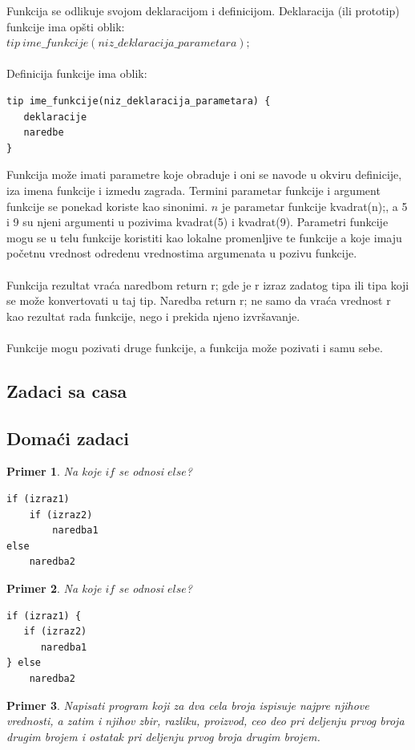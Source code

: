 \documentclass[a4paper]{article}
\newtheorem{primer}{Primer}[section]
\begin{document}
Funkcija se odlikuje svojom deklaracijom i definicijom.
Deklaracija (ili prototip) funkcije ima opšti oblik:\\
$tip\ ime\_funkcije(niz\_deklaracija\_parametara);$\\\\
Definicija funkcije ima oblik:
\begin{verbatim}
tip ime_funkcije(niz_deklaracija_parametara) {
   deklaracije
   naredbe
}
\end{verbatim}

Funkcija može imati parametre koje obraduje i oni se navode u
okviru definicije, iza imena funkcije i izmedu zagrada.
Termini parametar funkcije i argument funkcije se ponekad
koriste kao sinonimi.
$n$ je parametar funkcije kvadrat(n);, a 5 i 9 su
njeni argumenti u pozivima kvadrat(5) i kvadrat(9).
Parametri funkcije mogu se u telu funkcije koristiti kao lokalne
promenljive te funkcije a koje imaju početnu vrednost
odredenu vrednostima argumenata u pozivu funkcije.\\\\
Funkcija rezultat vraća naredbom return r; gde je r izraz
zadatog tipa ili tipa koji se može konvertovati u taj tip.
Naredba return r; ne samo da vraća vrednost r kao rezultat
rada funkcije, nego i prekida njeno izvršavanje.\\\\
Funkcije mogu pozivati druge funkcije, a funkcija može pozivati i samu sebe.

\subsection{Zadaci sa casa}

\subsection{Domaći zadaci}
\begin{primer}
Na koje $if$ se odnosi $else$?
\begin{verbatim}
if (izraz1)
    if (izraz2)
        naredba1
else
    naredba2
\end{verbatim}
\end{primer}
\begin{primer}
Na koje $if$ se odnosi $else$?
\begin{verbatim}
if (izraz1) {
   if (izraz2)
      naredba1
} else
    naredba2
\end{verbatim}
\end{primer}
\begin{primer}
Napisati program koji za dva cela broja ispisuje najpre
njihove vrednosti, a zatim i njihov zbir, razliku, proizvod, ceo deo pri deljenju
prvog broja drugim brojem i ostatak pri deljenju prvog broja drugim brojem. 
\end{primer}
\end{document}
